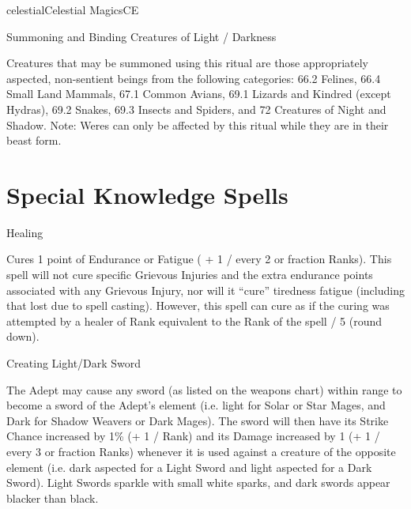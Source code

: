 \begin{College}[1.3]{celestial}{Celestial Magics}{CE}
\begin{ritual}[Q-2]{Summoning and Binding Creatures of Light / Darkness}
\begin{effects}
Creatures that may be summoned using this ritual are those
appropriately aspected, non-sentient beings from the following
categories: 66.2 Felines, 66.4 Small Land Mammals, 67.1 Common Avians,
69.1 Lizards and Kindred (except Hydras), 69.2 Snakes, 69.3 Insects
and Spiders, and 72 Creatures of Night and Shadow.  Note: Weres can
only be affected by this ritual while they are in their beast form.
\end{effects}
\end{ritual}


\section{Special Knowledge Spells}

\begin{spell}[S-1]{Healing}

\begin{effects}
Cures 1 point of Endurance or Fatigue ( + 1 / every 2 or fraction
Ranks).  This spell will not cure specific Grievous Injuries and the
extra endurance points associated with any Grievous Injury, nor will
it “cure” tiredness fatigue (including that lost due to spell
casting).  However, this spell can cure as if the curing was attempted
by a healer of Rank equivalent to the Rank of the spell / 5 (round
down).
\end{effects}
\end{spell}

\begin{spell}[S-2]{Creating Light/Dark Sword}
\begin{effects}
The Adept may cause any sword (as listed on the weapons chart) within
range to become a sword of the Adept’s element (i.e. light for Solar
or Star Mages, and Dark for Shadow Weavers or Dark Mages).  The sword
will then have its Strike Chance increased by 1\% (+ 1 / Rank) and its
Damage increased by 1 (+ 1 / every 3 or fraction Ranks) whenever it is
used against a creature of the opposite element (i.e. dark aspected
for a Light Sword and light aspected for a Dark Sword).  Light Swords
sparkle with small white sparks, and dark swords appear blacker than
black.
\end{effects}
\end{spell}


\end{College}
